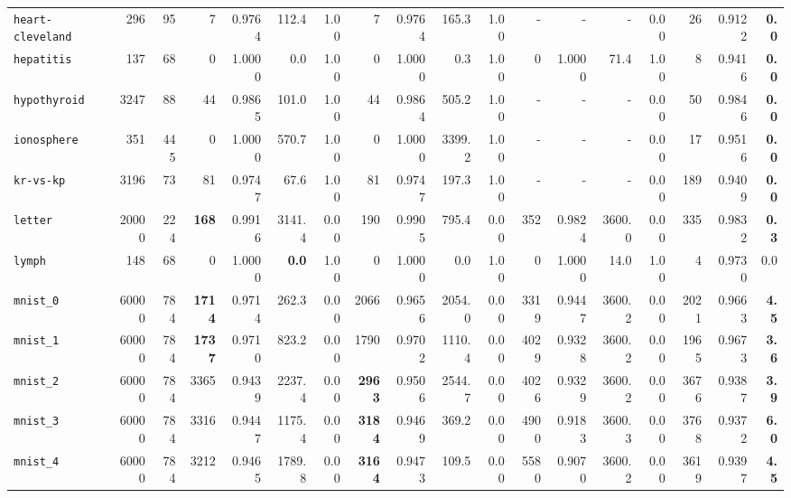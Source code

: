 \begin{tabular}{lccrrrrrrrrrrrrrrr}
\texttt{heart-cleveland} & \multicolumn{1}{r}{296} & \multicolumn{1}{r}{95}  & 7 & 0.9764 & 112.4 & 1.00 & 7 & 0.9764 & 165.3 & 1.00 & - & - & - & 0.00 & 26 & 0.9122 & \textbf{0.0}\\
\texttt{hepatitis} & \multicolumn{1}{r}{137} & \multicolumn{1}{r}{68}  & 0 & 1.0000 & 0.0 & 1.00 & 0 & 1.0000 & 0.3 & 1.00 & 0 & 1.0000 & 71.4 & 1.00 & 8 & 0.9416 & \textbf{0.0}\\
\texttt{hypothyroid} & \multicolumn{1}{r}{3247} & \multicolumn{1}{r}{88}  & 44 & 0.9865 & 101.0 & 1.00 & 44 & 0.9864 & 505.2 & 1.00 & - & - & - & 0.00 & 50 & 0.9846 & \textbf{0.0}\\
\texttt{ionosphere} & \multicolumn{1}{r}{351} & \multicolumn{1}{r}{445}  & 0 & 1.0000 & 570.7 & 1.00 & 0 & 1.0000 & 3399.2 & 1.00 & - & - & - & 0.00 & 17 & 0.9516 & \textbf{0.0}\\
\texttt{kr-vs-kp} & \multicolumn{1}{r}{3196} & \multicolumn{1}{r}{73}  & 81 & 0.9747 & 67.6 & 1.00 & 81 & 0.9747 & 197.3 & 1.00 & - & - & - & 0.00 & 189 & 0.9409 & \textbf{0.0}\\
\texttt{letter} & \multicolumn{1}{r}{20000} & \multicolumn{1}{r}{224}  & \textbf{168} & 0.9916 & 3141.4 & 0.00 & 190 & 0.9905 & 795.4 & 0.00 & 352 & 0.9824 & 3600.0 & 0.00 & 335 & 0.9832 & \textbf{0.3}\\
\texttt{lymph} & \multicolumn{1}{r}{148} & \multicolumn{1}{r}{68}  & 0 & 1.0000 & \textbf{0.0} & 1.00 & 0 & 1.0000 & 0.0 & 1.00 & 0 & 1.0000 & 14.0 & 1.00 & 4 & 0.9730 & 0.0\\
\texttt{mnist\_0} & \multicolumn{1}{r}{60000} & \multicolumn{1}{r}{784}  & \textbf{1714} & 0.9714 & 262.3 & 0.00 & 2066 & 0.9656 & 2054.0 & 0.00 & 3319 & 0.9447 & 3600.2 & 0.00 & 2021 & 0.9663 & \textbf{4.5}\\
\texttt{mnist\_1} & \multicolumn{1}{r}{60000} & \multicolumn{1}{r}{784}  & \textbf{1737} & 0.9710 & 823.2 & 0.00 & 1790 & 0.9702 & 1110.4 & 0.00 & 4029 & 0.9328 & 3600.2 & 0.00 & 1965 & 0.9673 & \textbf{3.6}\\
\texttt{mnist\_2} & \multicolumn{1}{r}{60000} & \multicolumn{1}{r}{784}  & 3365 & 0.9439 & 2237.4 & 0.00 & \textbf{2963} & 0.9506 & 2544.7 & 0.00 & 4026 & 0.9329 & 3600.2 & 0.00 & 3676 & 0.9387 & \textbf{3.9}\\
\texttt{mnist\_3} & \multicolumn{1}{r}{60000} & \multicolumn{1}{r}{784}  & 3316 & 0.9447 & 1175.4 & 0.00 & \textbf{3184} & 0.9469 & 369.2 & 0.00 & 4900 & 0.9183 & 3600.3 & 0.00 & 3768 & 0.9372 & \textbf{6.0}\\
\texttt{mnist\_4} & \multicolumn{1}{r}{60000} & \multicolumn{1}{r}{784}  & 3212 & 0.9465 & 1789.8 & 0.00 & \textbf{3164} & 0.9473 & 109.5 & 0.00 & 5580 & 0.9070 & 3600.2 & 0.00 & 3619 & 0.9397 & \textbf{4.5}\\

\end{tabular}
